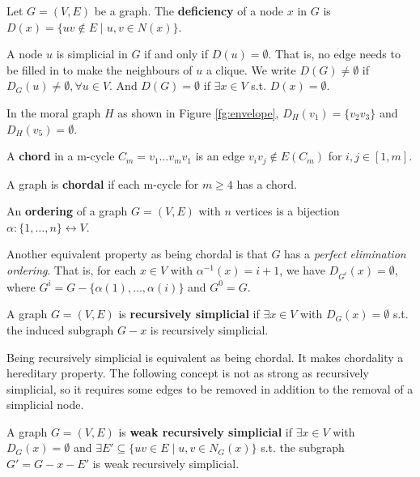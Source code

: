 \begin{definition}
Let $G=(V,E)$ be a graph. The \textbf{deficiency} of a node $x$ in $G$ is $D(x)=\{uv \notin E \mid u, v \in N(x)\}$.
\end{definition}
A node $u$ is simplicial in $G$ if and only if $D(u)=\emptyset$. That is, no edge needs to be filled in to make the neighbours of $u$ a clique. We write $D(G)\neq \emptyset$ if $D_G(u)\neq \emptyset, \forall u \in V$. And $D(G)=\emptyset$ if $\exists x \in V$ s.t. $D(x)=\emptyset$.
\begin{example}
In the moral graph $H$ as shown in Figure \ref{fg:envelope}, $D_H(v_1)=\{v_2v_3\}$ and $D_H(v_5)=\emptyset$. 
\end{example}

\begin{definition}
A \textbf{chord} in a m-cycle $C_m=v_1\dots v_mv_1$ is an edge $v_iv_j \notin E(C_m)$ for $i,j \in [1,m]$.
\end{definition}

\begin{definition}
A graph is \textbf{chordal} if each m-cycle for $m \ge 4$ has a chord.
\end{definition}

\begin{definition}
An \textbf{ordering} of a graph $G=(V,E)$ with $n$ vertices is a bijection $\alpha: \{1, \dots, n\} \leftrightarrow V$. 
\end{definition}
Another equivalent property as being chordal is that $G$ has a \textit{perfect elimination ordering}. That is, for each $x \in V$ with $\alpha^{-1}(x)=i+1$, we have $D_{G^i}(x)=\emptyset$, where $G^i=G-\{\alpha(1),\dots,\alpha(i)\}$ and $G^0=G$.

\begin{definition}
A graph $G=(V,E)$ is \textbf{recursively simplicial} if $\exists x \in V$ with $D_G(x)=\emptyset$ s.t. the induced subgraph $G-x$ is recursively simplicial. 
\end{definition}
Being recursively simplicial is equivalent as being chordal. It makes chordality a hereditary property. The following concept is not as strong as recursively simplicial, so it requires some edges to be removed in addition to the removal of a simplicial node. 

\begin{definition}
\label{def:wrs}
A graph $G=(V,E)$ is \textbf{weak recursively simplicial} if $\exists x \in V$ with $D_G(x)=\emptyset$ and $\exists E'\subseteq \{uv \in E \mid u,v \in N_G(x)\}$ s.t. the subgraph $G'=G-x-E'$ is weak recursively simplicial. 
\end{definition}

